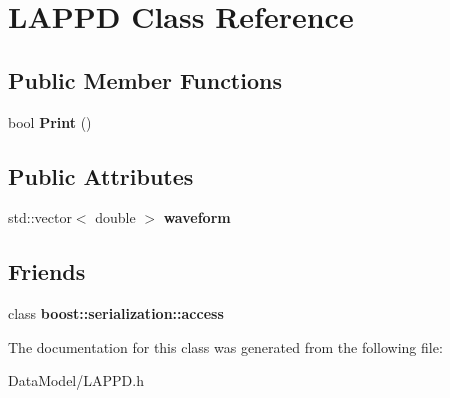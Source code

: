 \hypertarget{classLAPPD}{\section{L\-A\-P\-P\-D Class Reference}
\label{classLAPPD}
}
\subsection*{Public Member Functions}
\begin{DoxyCompactItemize}
\item 
\hypertarget{classLAPPD_a6ef9e3c05e38b61c75cd12822ab5ce98}{bool {\bfseries Print} ()}\label{classLAPPD_a6ef9e3c05e38b61c75cd12822ab5ce98}

\end{DoxyCompactItemize}
\subsection*{Public Attributes}
\begin{DoxyCompactItemize}
\item 
\hypertarget{classLAPPD_a1b6bdd53a3523932fe22ad3b5471c91b}{std\-::vector$<$ double $>$ {\bfseries waveform}}\label{classLAPPD_a1b6bdd53a3523932fe22ad3b5471c91b}

\end{DoxyCompactItemize}
\subsection*{Friends}
\begin{DoxyCompactItemize}
\item 
\hypertarget{classLAPPD_ac98d07dd8f7b70e16ccb9a01abf56b9c}{class {\bfseries boost\-::serialization\-::access}}\label{classLAPPD_ac98d07dd8f7b70e16ccb9a01abf56b9c}

\end{DoxyCompactItemize}


The documentation for this class was generated from the following file\-:\begin{DoxyCompactItemize}
\item 
Data\-Model/L\-A\-P\-P\-D.\-h\end{DoxyCompactItemize}
